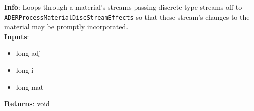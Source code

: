 \textbf{Info}: Loops through a material's streams passing discrete type streams
off to \texttt{ADERProcessMaterialDiscStreamEffects} so that these stream's
changes to the material may be promptly incorporated.\\

\noindent \textbf{Inputs}:
\begin{itemize}
\item{long adj}
\item{long i}
\item{long mat}
\end{itemize}

\noindent \textbf{Returns}: void
